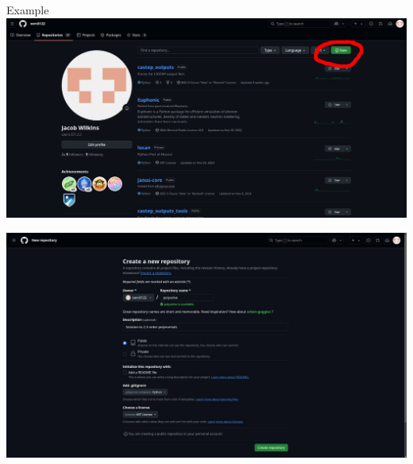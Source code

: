 \documentclass[usenames,dvipsnames]{beamer}
\begin{document}
\begin{frame}{Example}
     {
            \hspace*{-2.75em}\includegraphics[width=1.2\textwidth]{Images/new-repo.jpg}
    }
     {
            \begin{center}
                \includegraphics[trim=20cm 0 20cm 0, clip, height=0.8\textheight]{Images/creatingrepo.jpg}
            \end{center}
    }
\end{frame}
\end{document}
